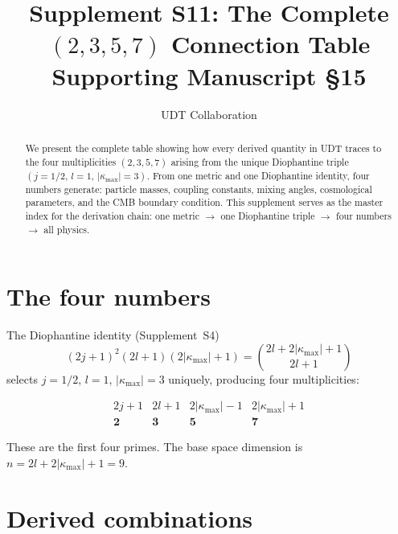 \documentclass[11pt,letterpaper]{article}
\title{Supplement S11: The Complete $(2,3,5,7)$ Connection Table \\
\large Supporting Manuscript \S15}
\author{UDT Collaboration}
\date{}
\numberwithin{equation}{section}
\begin{document}
\maketitle

\begin{abstract}
We present the complete table showing how every derived quantity in UDT
traces to the four multiplicities $(2,3,5,7)$ arising from the unique
Diophantine triple $(j=1/2,\, l=1,\, |\kappa_\mathrm{max}|=3)$.
From one metric and one Diophantine identity, four numbers generate:
particle masses, coupling constants, mixing angles, cosmological
parameters, and the CMB boundary condition. This supplement serves as the
master index for the derivation chain: one metric $\to$ one Diophantine
triple $\to$ four numbers $\to$ all physics.
\end{abstract}

\tableofcontents

\section{The four numbers}
\label{sec:four_numbers}

The Diophantine identity (Supplement~S4)
\begin{equation}
  (2j+1)^2(2l+1)(2|\kappa_\mathrm{max}|+1) = \binom{2l+2|\kappa_\mathrm{max}|+1}{2l+1}
\end{equation}
selects $j = 1/2$, $l = 1$, $|\kappa_\mathrm{max}| = 3$ uniquely, producing
four multiplicities:

\begin{equation}
\label{eq:four_numbers}
\boxed{
\begin{array}{cccc}
  2j+1 & 2l+1 & 2|\kappa_\mathrm{max}|-1 & 2|\kappa_\mathrm{max}|+1 \\
  \mathbf{2} & \mathbf{3} & \mathbf{5} & \mathbf{7}
\end{array}
}
\end{equation}

These are the first four primes. The base space dimension is
$n = 2l + 2|\kappa_\mathrm{max}| + 1 = 9$.

\section{Derived combinations}
\label{sec:combinations}
\end{document}
